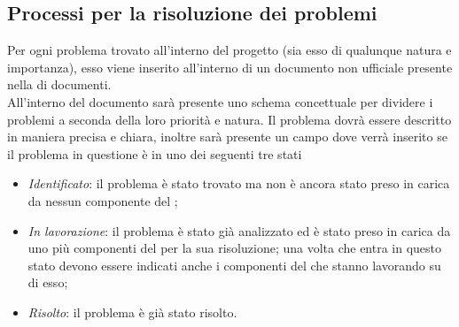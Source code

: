 \subsection{Processi per la risoluzione dei problemi}
Per ogni problema trovato all'interno del progetto (sia esso di qualunque natura e importanza), esso viene inserito all'interno di un documento non ufficiale presente nella  di documenti. \\
All'interno del documento sarà presente uno schema concettuale per dividere i problemi a seconda della loro priorità e natura. Il problema dovrà essere descritto in maniera precisa e chiara, inoltre sarà presente un campo dove verrà inserito se il problema in questione è in uno dei seguenti tre stati
\begin{itemize}
	\item \textit{Identificato}: il problema è stato trovato ma non è ancora stato preso in carica da nessun componente del ;
	\item\textit{In lavorazione}: il problema è stato già analizzato ed è stato preso in carica da uno più componenti del  per la sua risoluzione; una volta che entra in questo stato devono essere indicati anche i componenti del  che stanno lavorando su di esso;
	\item \textit{Risolto}: il problema è già stato risolto.
\end{itemize}

\newpage